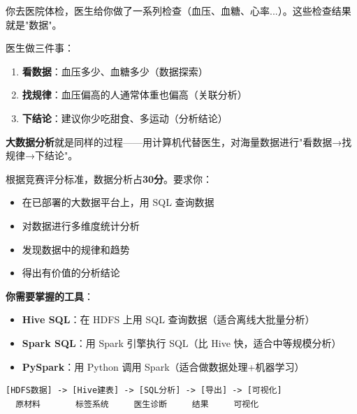 \documentclass[12pt,a4paper]{article}
\begin{document}
\begin{theorybox}[用体检报告理解大数据分析]
你去医院体检，医生给你做了一系列检查（血压、血糖、心率...）。这些检查结果就是"数据"。

医生做三件事：
\begin{enumerate}
    \item \textbf{看数据}：血压多少、血糖多少（数据探索）
    \item \textbf{找规律}：血压偏高的人通常体重也偏高（关联分析）
    \item \textbf{下结论}：建议你少吃甜食、多运动（分析结论）
\end{enumerate}

\textbf{大数据分析}就是同样的过程——用计算机代替医生，对海量数据进行"看数据→找规律→下结论"。
\end{theorybox}

\begin{knowledgebox}[竞赛中的数据分析考什么？]
根据竞赛评分标准，数据分析占\textbf{30分}。要求你：
\begin{itemize}
    \item 在已部署的大数据平台上，用 SQL 查询数据
    \item 对数据进行多维度统计分析
    \item 发现数据中的规律和趋势
    \item 得出有价值的分析结论
\end{itemize}

\textbf{你需要掌握的工具}：
\begin{itemize}
    \item \textbf{Hive SQL}：在 HDFS 上用 SQL 查询数据（适合离线大批量分析）
    \item \textbf{Spark SQL}：用 Spark 引擎执行 SQL（比 Hive 快，适合中等规模分析）
    \item \textbf{PySpark}：用 Python 调用 Spark（适合做数据处理+机器学习）
\end{itemize}
\end{knowledgebox}

\begin{tipbox}[分析流程一图看懂]
\begin{footnotesize}
\begin{verbatim}
[HDFS数据] -> [Hive建表] -> [SQL分析] -> [导出] -> [可视化]
  原材料       标签系统     医生诊断     结果     可视化
\end{verbatim}
\end{footnotesize}
\end{tipbox}

\end{document}
